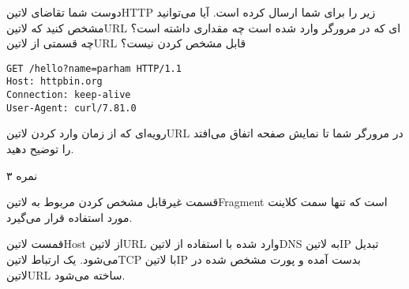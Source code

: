 \documentclass[../main.tex]{subfiles}
\begin{document}

دوست شما تقاضای ‌لاتین{HTTP} زیر را برای شما ارسال کرده است.
آیا می‌توانید مشخص کنید که ‌لاتین{URL} ای که در مرورگر وارد شده است چه مقداری داشته است؟
چه قسمتی از ‌لاتین{URL} قابل مشخص کردن نیست؟

\begin{latin}
\begin{verbatim}
GET /hello?name=parham HTTP/1.1
Host: httpbin.org
Connection: keep-alive
User-Agent: curl/7.81.0
\end{verbatim}
\end{latin}

رویه‌ای که از زمان وارد کردن ‌لاتین{URL} در مرورگر شما تا نمایش صفحه اتفاق می‌افتد را توضیح دهید.

۳ نمره


قسمت غیرقابل مشخص کردن مربوط به ‌لاتین{Fragment} است که تنها سمت کلاینت مورد استفاده قرار می‌گیرد.

 قمست ‌لاتین{Host} از ‌لاتین{URL} وارد شده با استفاده از ‌لاتین{DNS} به ‌لاتین{IP} تبدیل می‌شود.
 یک ارتباط ‌لاتین{TCP} با ‌لاتین{IP} بدست آمده و پورت مشخص شده در ‌لاتین{URL} ساخته می‌شود.

\end{document}
